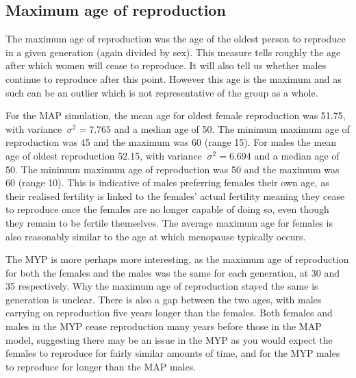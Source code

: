 \documentclass[authoryearcitations]{UoYCSproject}
\begin{document}
\subsection{Maximum age of reproduction}
The maximum age of reproduction was the age of the oldest person to reproduce in a given generation (again divided by sex). This measure tells roughly the age after which women will cease to reproduce. It will also tell us whether males continue to reproduce after this point. However this age is the maximum and as such can be an outlier which is not representative of the group as a whole. 

For the MAP simulation, the mean age for oldest female reproduction was 51.75, with variance $\ \sigma^2 = 7.765 $ and a median age of 50. The minimum maximum age of reproduction was 45 and the maximum was 60 (range 15). For males the mean age of oldest reproduction 52.15, with variance $\ \sigma^2 = 6.694 $ and a median age of 50. The minimum maximum age of reproduction was 50 and the maximum was 60 (range 10). This is indicative of males preferring females their own age, as their realised fertility is linked to the females' actual fertility meaning they cease to reproduce once the females are no longer capable of doing so, even though they remain to be fertile themselves. The average maximum age for females is also reasonably similar to the age at which menopause typically occurs.

The MYP is more perhaps more interesting, as the maximum age of reproduction for both the females and the males was the same for each generation, at 30 and 35 respectively. Why the maximum age of reproduction stayed the same is generation is unclear. There is also a gap between the two ages, with males carrying on reproduction five years longer than the females. Both females and males in the MYP cease reproduction many years before those in the MAP model, suggesting there may be an issue in the MYP as you would expect the females to reproduce for fairly similar amounts of time, and for the MYP males to reproduce for longer than the MAP males.
\end{document}
